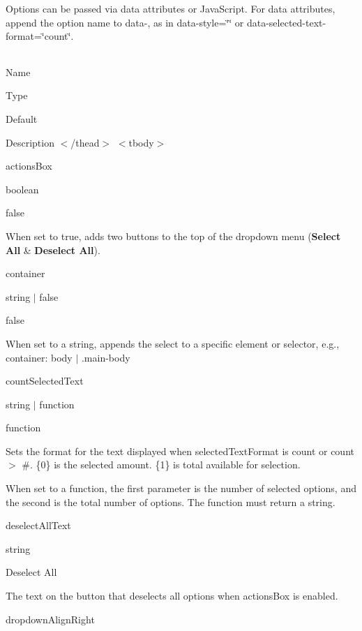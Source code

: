 



Options can be passed via data attributes or Java\+Script. For data attributes, append the option name to {\ttfamily data-\/}, as in {\ttfamily data-\/style=\char`\"{}\char`\"{}} or {\ttfamily data-\/selected-\/text-\/format=\char`\"{}count\char`\"{}}.

\tabulinesep=1mm
\begin{longtabu} spread 0pt [c]{*{0}{|X[-1]}|}
\hline
\end{longtabu}


Name 

Type 

Default 

Description  $<$/thead$>$ $<$tbody$>$ 

actions\+Box 

boolean 

{\ttfamily false} 

When set to {\ttfamily true}, adds two buttons to the top of the dropdown menu ({\bfseries Select All} \& {\bfseries Deselect All}).

container 

string $\vert$ false 

{\ttfamily false} 

When set to a string, appends the select to a specific element or selector, e.\+g., {\ttfamily container\+: \textquotesingle{}body\textquotesingle{} $\vert$ \textquotesingle{}.main-\/body\textquotesingle{}}

count\+Selected\+Text 

string $\vert$ function 

{\ttfamily function} 

Sets the format for the text displayed when selected\+Text\+Format is {\ttfamily count} or {\ttfamily count $>$ \#}. \{0\} is the selected amount. \{1\} is total available for selection.

When set to a function, the first parameter is the number of selected options, and the second is the total number of options. The function must return a string.

deselect\+All\+Text 

string 

{\ttfamily \textquotesingle{}Deselect All\textquotesingle{}} 

The text on the button that deselects all options when {\ttfamily actions\+Box} is enabled.

dropdown\+Align\+Right 

